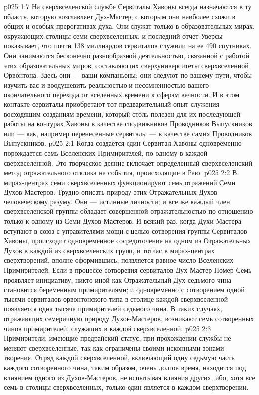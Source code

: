 \vs p025 1:7 На сверхвселенской службе Сервиталы Хавоны всегда назначаются в ту область, которую возглавляет Дух\hyp{}Мастер, с которым они наиболее схожи в общих и особых прерогативах духа. Они служат только в образовательных мирах, окружающих столицы семи сверхвселенных, и последний отчет Уверсы показывает, что почти 138 миллиардов сервиталов служили на ее 490 спутниках. Они занимаются бесконечно разнообразной деятельностью, связанной с работой этих образовательных миров, составляющих сверхуниверситеты сверхвселенной Орвонтона. Здесь они --- ваши компаньоны; они следуют по вашему пути, чтобы изучить вас и воодушевить реальностью и несомненностью вашего окончательного перехода от вселенных времени к сферам вечности. И в этом контакте сервиталы приобретают тот предварительный опыт служения восходящим созданиям времени, который столь полезен для их последующей работы на контурах Хавоны в качестве сподвижников Проводников Выпускников или --- как, например перенесенные сервиталы --- в качестве самих Проводников Выпускников.
\vs p025 2:1 Когда создается один Сервитал Хавоны одновременно порождается семь Вселенских Примирителей, по одному в каждой сверхвселенной. Это творческое деяние включает определенный сверхвселенский метод отражательного отклика на события, происходящие в Раю.
\vs p025 2:2 В мирах\hyp{}центрах семи сверхвселенных функционируют семь отражений Семи Духов\hyp{}Мастеров. Трудно описать природу этих Отражательных Духов человеческому разуму. Они --- истинные личности; и все же каждый член сверхвселенской группы обладает совершенной отражательностью по отношению только к одному из Семи Духов\hyp{}Мастеров. И всякий раз, когда Духи\hyp{}Мастера вступают в союз с управителями мощи с целью сотворения группы Сервиталов Хавоны, происходит одновременное сосредоточение на одном из Отражательных Духов в каждой из сверхвселенских групп, и тотчас в мирах\hyp{}центрах сверхтворений, вполне оформившись, появляется равное число Вселенских Примирителей. Если в процессе сотворения сервиталов Дух\hyp{}Мастер Номер Семь проявляет инициативу, никто иной как Отражательный Дух седьмого чина становится беременным примирителями; и одновременно с сотворением одной тысячи сервиталов орвонтонского типа в столице каждой сверхвселенной появляется одна тысяча примирителей седьмого чина. В таких случаях, отражающих семеричную природу Духов\hyp{}Мастеров, возникают семь сотворенных чинов примирителей, служащих в каждой сверхвселенной.
\vs p025 2:3 Примирители, имеющие предрайский статус, при прохождении службы не меняют сверхвселенные, так как ограничены своими исконными зонами творения. Отряд каждой сверхвселенной, включающий одну седьмую часть каждого сотворенного чина, таким образом, очень долгое время, находится под влиянием одного из Духов\hyp{}Мастеров, не испытывая влияния других, ибо, хотя все семь  в столицы сверхвселенных, только один является  в каждом сверхтворении.
